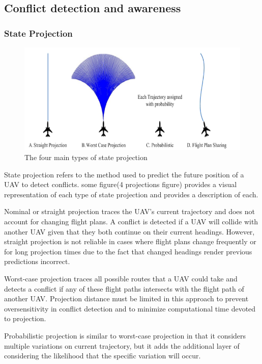 \documentclass[conference]{IEEEtran}
\begin{document}
\subsection{Conflict detection and awareness}


\subsubsection{State Projection}

\begin{figure}[h]
	\includegraphics [width=1\columnwidth] {2009RahimProject}
	\caption{The four main types of state projection \cite{albaker2009survey}}
	\label{fig:09RahimProject}
\end{figure}

State projection refers to the method used to predict the future position of a UAV to detect conflicts. some figure(4 projections figure) provides a visual representation of each type of state projection and \cite{albaker2009survey} provides a description of each.

Nominal or straight projection traces the UAV’s current trajectory and does not account for changing flight plans.  A conflict is detected if a UAV will collide with another UAV given that they both continue on their current headings.  However, straight projection is not reliable in cases where flight plans change frequently or for long projection times due to the fact that changed headings render previous predictions incorrect.

Worst-case projection traces all possible routes that a UAV could take and detects a conflict if any of these flight paths intersects with the flight path of another UAV.  Projection distance must be limited in this approach to prevent oversensitivity in conflict detection and to minimize computational time devoted to projection.

Probabilistic projection is similar to worst-case projection in that it considers multiple variations on current trajectory, but it adds the additional layer of considering the likelihood that the specific variation will occur.  
\end{document}
